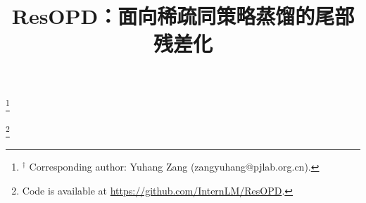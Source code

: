 \documentclass{template}
\title{ResOPD：面向稀疏同策略蒸馏的尾部残差化}
\newcommand\blfootnote[1]{%
  \begingroup
  \renewcommand\thefootnote{}\footnote{#1}%
  \addtocounter{footnote}{-1}%
  \endgroup
}
\begin{document}
\blfootnote{$^\dagger$ Corresponding author: Yuhang Zang (zangyuhang@pjlab.org.cn).}
\blfootnote{Code is available at \url{https://github.com/InternLM/ResOPD}.}

\maketitle




\FloatBarrier

\FloatBarrier


\FloatBarrier

\renewcommand{\bibfont}{\small}
\setlength{\bibsep}{3pt plus 1pt minus 1pt}



\clearpage

\end{document}
